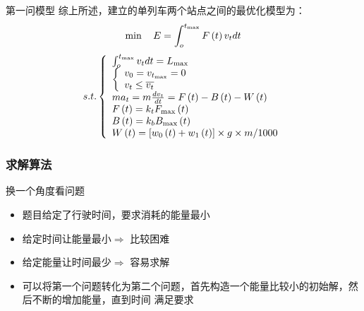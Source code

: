 \documentclass{beamer}
\begin{document}
\begin{frame}{第一问模型}
 综上所述，建立的单列车两个站点之间的最优化模型为：
\[\min {\kern 1pt} {\kern 1pt} {\kern 1pt} {\kern 1pt} {\kern 1pt} {\kern 1pt} {\kern 1pt} {\kern 1pt} {\kern 1pt} {\kern 1pt} E = \int_o^{{t_{\max }}} {F\left( t \right){v_t}dt} \]
\[s.t.\left\{ \begin{array}{l}
 \int_o^{{t_{\max }}} {{v_t}dt}  = {L_{\max }} \\
 \left\{ \begin{array}{l}
 {v_0} = {v_{{t_{\max }}}} = 0 \\
 {v_t} \le \overline {{v_t}}  \\
 \end{array} \right. \\
 m{a_t} = m\frac{{d{v_t}}}{{dt}} = F\left( t \right) - B\left( t \right) - W\left( t \right) \\
 F\left( t \right) = {k_t}{F_{\max }}\left( t \right) \\
 B\left( t \right) = {k_b}{B_{\max }}\left( t \right) \\
 W\left( t \right) = \left[ {{w_0}\left( t \right) + {w_1}\left( t \right)} \right] \times g \times {m \mathord{\left/
 {\vphantom {m {1000}}} \right.
 \kern-\nulldelimiterspace} {1000}} \\
 \end{array} \right.\]

\end{frame}

\subsubsection{求解算法}
\begin{frame}{换一个角度看问题}

\begin{itemize}
  \item<1-> 题目给定了行驶时间，要求消耗的能量最小
  \item<2-> 给定时间让能量最小$\Longrightarrow$ 比较困难
  \item<3-> 给定能量让时间最少$\Longrightarrow$ 容易求解
  \item<4-> 可以将第一个问题转化为第二个问题，首先构造一个能量比较小的初始解，然后不断的增加能量，直到时间
  满足要求
\end{itemize}
\end{frame}
\end{document}
